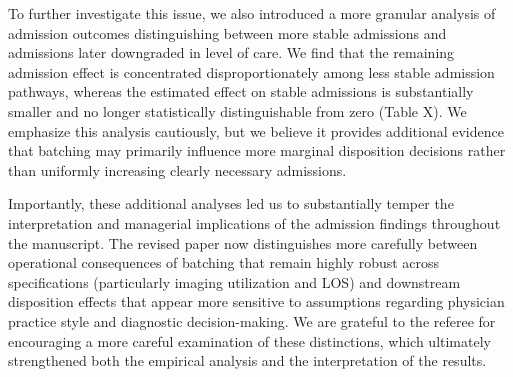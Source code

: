 \documentclass[11pt]{article}
\newcommand{\1}{\hbox{\rm 1\kern-.35em 1}}
\begin{document}
To further investigate this issue, we also introduced a more granular analysis of admission outcomes distinguishing between more stable admissions and admissions later downgraded in level of care. We find that the remaining admission effect is concentrated disproportionately among less stable admission pathways, whereas the estimated effect on stable admissions is substantially smaller and no longer statistically distinguishable from zero (Table X). We emphasize this analysis cautiously, but we believe it provides additional evidence that batching may primarily influence more marginal disposition decisions rather than uniformly increasing clearly necessary admissions.

Importantly, these additional analyses led us to substantially temper the interpretation and managerial implications of the admission findings throughout the manuscript. The revised paper now distinguishes more carefully between operational consequences of batching that remain highly robust across specifications (particularly imaging utilization and LOS) and downstream disposition effects that appear more sensitive to assumptions regarding physician practice style and diagnostic decision-making. We are grateful to the referee for encouraging a more careful examination of these distinctions, which ultimately strengthened both the empirical analysis and the interpretation of the results.
\color{black}
\end{document}
